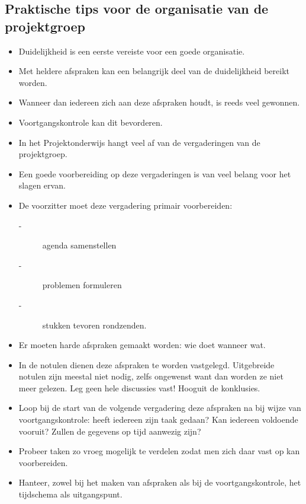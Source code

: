 \subsection{Praktische tips voor de organisatie van de projektgroep}
\begin{itemize}

\item   Duidelijkheid is een eerste vereiste voor een goede 
     organisatie.
\item
  Met heldere afspraken kan een belangrijk deel van de
     duidelijkheid bereikt worden.
\item
   Wanneer dan iedereen zich aan deze afspraken houdt, is
     reeds veel gewonnen.
\item
   Voortgangskontrole kan dit bevorderen.
\item
   In het Projektonderwijs hangt veel af van de vergaderingen van de projektgroep.
\item
   Een goede voorbereiding op deze vergaderingen is van veel
     belang voor het slagen ervan.
\item
   De voorzitter moet deze vergadering primair voorbereiden:
\begin{description}
     \item[-]    agenda samenstellen
     \item[-]    problemen formuleren
     \item[-]    stukken tevoren rondzenden.
\end{description}
\item
   Er moeten harde afspraken gemaakt worden: wie doet wanneer wat.
\item
   In de notulen dienen deze afspraken te worden vastgelegd.
     Uitgebreide notulen zijn meestal niet nodig, zelfs ongewenst want dan worden ze niet meer gelezen. Leg geen hele
     discussies vast! Hooguit de konklusies.
\item
  Loop bij de start van de volgende vergadering deze afspraken na bij wijze van voortgangs\-kon\-tro\-le:
  heeft iedereen zijn taak gedaan? Kan iedereen voldoende vooruit?
     Zullen de gegevens op tijd aanwezig zijn?
\item
  Probeer taken zo vroeg mogelijk te verdelen zodat men
     zich daar vast op kan voorbereiden.
\item
  Hanteer, zowel bij het maken van afspraken als bij de
     voortgangskontrole, het tijdschema als uitgangspunt.
\end{itemize}

